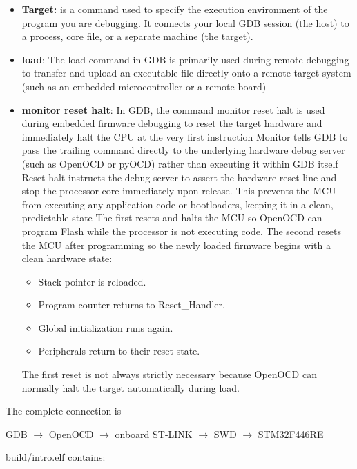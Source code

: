 \documentclass{report}
\begin{document}
    \begin{itemize}
        \item \textbf{Target:}  is a command used to specify the execution environment of the program you are debugging. It connects your local GDB session (the host) to a process, core file, or a separate machine (the target). 
        \item \textbf{load}:  The load command in GDB is primarily used during remote debugging to transfer and upload an executable file directly onto a remote target system (such as an embedded microcontroller or a remote board)
        \item \textbf{monitor reset halt}: In GDB, the command monitor reset halt is used during embedded firmware debugging to reset the target hardware and immediately halt the CPU at the very first instruction
            \bigbreak \noindent 
            Monitor tells GDB to pass the trailing command directly to the underlying hardware debug server (such as OpenOCD or pyOCD) rather than executing it within GDB itself
            \bigbreak \noindent 
            Reset halt instructs the debug server to assert the hardware reset line and stop the processor core immediately upon release. This prevents the MCU from executing any application code or bootloaders, keeping it in a clean, predictable state
            \bigbreak \noindent 
            The first resets and halts the MCU so OpenOCD can program Flash while the processor is not executing code.
            \bigbreak \noindent 
            The second resets the MCU after programming so the newly loaded firmware begins with a clean hardware state:
            \begin{itemize}
                \item Stack pointer is reloaded.
                \item Program counter returns to Reset\_Handler.
                \item Global initialization runs again.
                \item Peripherals return to their reset state.
            \end{itemize}
            The first reset is not always strictly necessary because OpenOCD can normally halt the target automatically during load.
    \end{itemize}
    The complete connection is
    \begin{center}
        GDB $\to$ OpenOCD $\to$ onboard ST-LINK $\to$ SWD $\to$ STM32F446RE
    \end{center}
    build/intro.elf contains:
\end{document}
